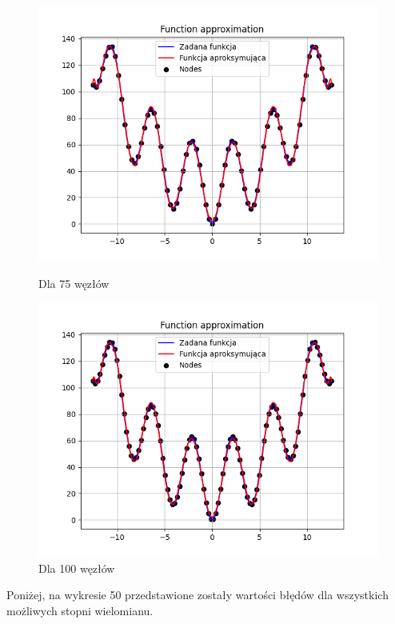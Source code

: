 \documentclass{article}
\begin{document}
\begin{figure}[H]
\begin{minipage}[b]{0.49\textwidth}
    \begin{minipage}[b]{\textwidth}
      \includegraphics[width=\textwidth]{img48.png}
      \caption{Dla 75 węzłów}
    \end{minipage}
    \vspace*{\fill}
    \begin{minipage}[b]{\textwidth}
      \includegraphics[width=\textwidth]{img49.png}
      \caption{Dla 100 węzłów}
    \end{minipage}
  \end{minipage}
\end{figure}

Poniżej, na wykresie 50 przedstawione zostały wartości błędów dla wszystkich możliwych stopni wielomianu.
\end{document}
